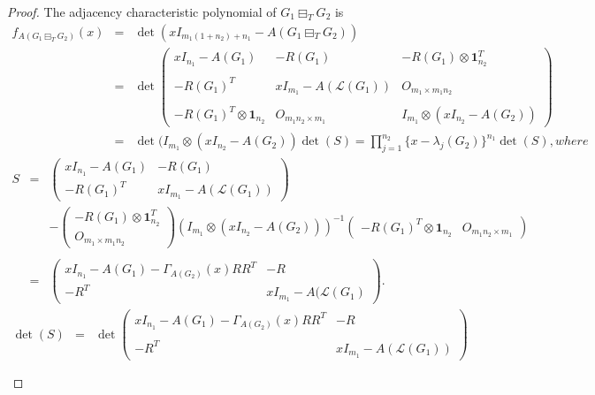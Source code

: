 \documentclass[a4paper,12pt]{article}
\begin{document}
\begin{proof}
\small
The adjacency characteristic polynomial of $G_{1} \boxminus_{T} G_{2}$ is
\begin{eqnarray*}
f_{A(G_{1} \boxminus_{T} G_{2})}(x)
&=&\det(xI_{m_{1}(1+n_{2})+n_{1}}-A(G_{1}\boxminus_{T} G_{2}))\\
&=&\det\begin{pmatrix}
xI_{n_{1}}-A(G_{1}) & -R(G_{1}) & -R(G_{1})\otimes \mathbf{1}_{n_{2}}^{T}\\\\
-R(G_{1})^{T} & xI_{m_{1}}-A(\mathcal{L}({G_{1}})) & O_{m_{1}\times m_{1}n_{2}}\\\\
-R(G_{1})^{T}\otimes \mathbf{1}_{n_{2}} & O_{m_{1}n_{2}\times m_{1}} & I_{m_{1}}\otimes (xI_{n_{2}}-A(G_{2}))
\end{pmatrix}\\
&=&\det(I_{m_{1}}\otimes (xI_{n_{2}}-A(G_{2}))\det(S)=\prod \limits_{j=1}^{n_{2}}\{x-\lambda_{j}(G_{2})\}^{n_{1}}\det(S), where
\end{eqnarray*}
\begin{eqnarray*}
S&=&\begin{pmatrix}
xI_{n_{1}}-A(G_{1}) & -R(G_{1}) \\
-R(G_{1})^{T} & xI_{m_{1}}-A(\mathcal{L}({G_{1}}))
\end{pmatrix}
\\&&-
\begin{pmatrix}
-R(G_{1})\otimes \mathbf{1}_{n_{2}}^{T} \\
O_{m_{1}\times m_{1}n_{2}}
\end{pmatrix}
(I_{m_{1}}\otimes (xI_{n_{2}}-A(G_{2})))^{-1}
\begin{pmatrix}
-R(G_{1})^{T}\otimes \mathbf{1}_{n_{2}} & O_{m_{1}n_{2}\times m_{1}}
\end{pmatrix}\\\\
&=&\begin{pmatrix}
xI_{n_{1}}-A(G_{1})-\Gamma_{A(G_{2})}(x)RR^{T} & -R \\
-R^{T} & xI_{m_{1}}-A(\mathcal{L}(G_{1})
\end{pmatrix}.
\end{eqnarray*}
\begin{eqnarray*}
\det(S)&=&\det\begin{pmatrix}
xI_{n_{1}}-A(G_{1})-\Gamma_{A(G_{2})}(x)RR^{T} & -R \\\\
-R^{T} & xI_{m_{1}}-A(\mathcal{L}(G_{1}))
\end{pmatrix}\\\\

\end{eqnarray*}
\end{proof}
\end{document}

